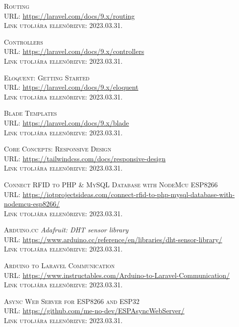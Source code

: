 \documentclass[
]{thesis-ekf}
\theoremstyle{definition}
\theoremstyle{remark}
\begin{document}
\begin{thebibliography}{20}
		\textsc{Routing}\\
		\textsc{URL:} \url{https://laravel.com/docs/9.x/routing}\\
		\textsc{Link utoljára ellenőrizve:} 2023.03.31.
		
		\textsc{Controllers}\\
		\textsc{URL:} \url{https://laravel.com/docs/9.x/controllers}\\
		\textsc{Link utoljára ellenőrizve:} 2023.03.31.
		
		\textsc{Eloquent: Getting Started}\\
		\textsc{URL:} \url{https://laravel.com/docs/9.x/eloquent}\\
		\textsc{Link utoljára ellenőrizve:} 2023.03.31.
		
		\textsc{Blade Templates}\\
		\textsc{URL:} \url{https://laravel.com/docs/9.x/blade}\\
		\textsc{Link utoljára ellenőrizve:} 2023.03.31.
		
		\textsc{Core Concepts: Responsive Design}\\
		\textsc{URL:} \url{https://tailwindcss.com/docs/responsive-design}\\
		\textsc{Link utoljára ellenőrizve:} 2023.03.31.
		
		\textsc{Connect RFID to PHP \& MySQL Database with NodeMcu ESP8266}\\
		\textsc{URL:} \url{https://iotprojectsideas.com/connect-rfid-to-php-mysql-database-with-nodemcu-esp8266/}\\
		\textsc{Link utoljára ellenőrizve:} 2023.03.31.
		
		\textsc{Arduino.cc} \emph{Adafruit: DHT sensor library}\\
		\textsc{URL:} \url{https://www.arduino.cc/reference/en/libraries/dht-sensor-library/}\\
		\textsc{Link utoljára ellenőrizve:} 2023.03.31.
		
		\textsc{Arduino to Laravel Communication}\\
		\textsc{URL:} \url{https://www.instructables.com/Arduino-to-Laravel-Communication/}\\
		\textsc{Link utoljára ellenőrizve:} 2023.03.31.
		
		\textsc{Async Web Server for ESP8266 and ESP32}\\
		\textsc{URL:} \url{https://github.com/me-no-dev/ESPAsyncWebServer/}\\
		\textsc{Link utoljára ellenőrizve:} 2023.03.31.
		

\end{thebibliography}
\end{document}
